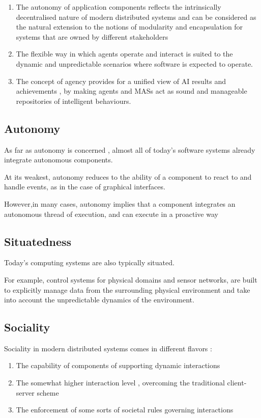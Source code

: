 \documentclass{article}
\begin{document}
\begin{enumerate}
    \item The autonomy of application components reflects the intrinsically decentralised nature of modern distributed systems and can be considered as the natural extension to the notions of modularity and encapsulation for systems that are owned by different stakeholders 
    \item The flexible way in which agents operate and interact  is suited to the dynamic and unpredictable scenarios where software is expected to operate.
    \item The concept of agency provides for a unified view of AI results and achievements , by making agents and MASs act as sound and manageable repositories of intelligent behaviours.
\end{enumerate}

\subsection{Autonomy}

As far as autonomy is concerned , almost all of today's software systems already integrate autonomous components.

At its weakest, autonomy reduces to the ability of a component to react to and handle events, as in the case of graphical interfaces.

However,in many cases, autonomy implies that a component integrates an autonomous thread of execution, and can execute in a proactive way

\subsection{Situatedness}

Today's computing systems are also typically situated.

For example, control systems for physical domains and sensor networks, are built to explicitly manage data from the surrounding physical environment and take into account the unpredictable dynamics of the environment.

\subsection{Sociality}

Sociality in modern distributed systems comes in different flavors :

\begin{enumerate}
    \item The capability of components of supporting dynamic interactions
    \item The somewhat higher interaction level , overcoming the traditional client-server scheme
    \item The enforcement of some sorts of societal rules governing interactions
\end{enumerate}
\end{document}
